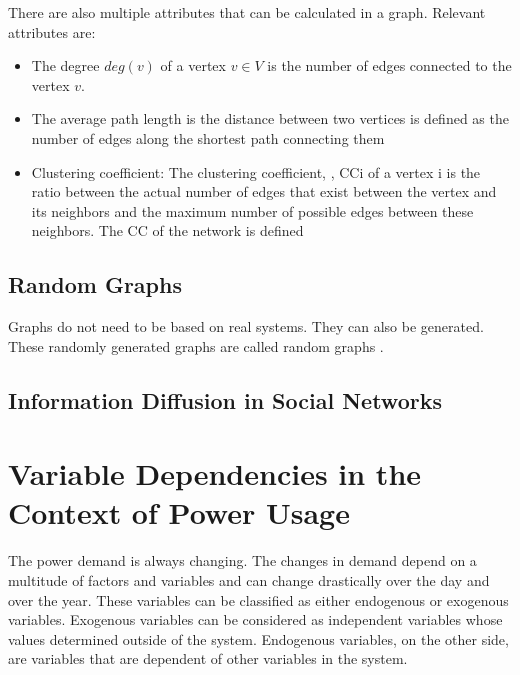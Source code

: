 There are also multiple attributes that can be calculated in a graph. 
Relevant attributes are:
\begin{itemize}
    \item The degree $deg(v)$ of a vertex $v \in V$ is the number of edges connected to the
    vertex $v$. 
    \item The average path length is the distance between two vertices is
    defined as the number of edges along the shortest path
    connecting them %
    \item Clustering coefficient: The clustering coefficient, , CCi
    of a vertex i
     is the ratio between the actual number of edges
    that exist between the vertex and its neighbors and the
    maximum number of possible edges between these
    neighbors. The
    CC
    of the network is defined %
\end{itemize}

\subsection{Random Graphs}

Graphs do not need to be based on real systems. They can also be generated. 
These randomly generated graphs are called random graphs \cite{randomgraphs}.



\subsection{Information Diffusion in Social Networks}


\section{Variable Dependencies in the Context of Power Usage}

The power demand is always changing. The changes in demand depend on a multitude 
of factors and variables and can change drastically over the day and over the year.
These variables can be classified as either endogenous or exogenous variables.
Exogenous variables can be considered as independent variables 
whose values determined outside of the system. 
Endogenous variables, on the other side, 
are variables that are dependent of other variables in the 
system.

